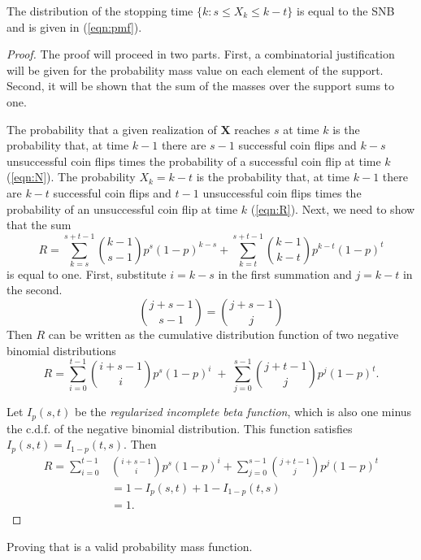 \documentclass[12pt]{article}         %
\begin{document}
\begin{prop}
The distribution of the stopping time $\{k: s \leq X_k \leq k-t \}$ is equal to the SNB and is given in (\ref{eqn:pmf}). 
\end{prop}
\begin{proof}
The proof will proceed in two parts. First, a combinatorial justification will be given for the probability mass value on each element of the support. Second, it will be shown that the sum of the masses over the support sums to one.

The probability that a given realization of $\mathbf{X}$ reaches $s$ at 
time $k$ is  the probability that, at time $k-1$ there are $s-1$ successful 
coin flips and $k-s$ unsuccessful coin flips times the probability of a 
successful coin flip at time $k$ (\ref{eqn:N}). The probability $X_k = k-t$ 
is the probability that, at time $k-1$ there are $k-t$ successful coin flips 
and $t-1$ unsuccessful coin flips times the probability of an unsuccessful 
coin flip at time $k$ (\ref{eqn:R}).  Next, we need to show that the sum
\begin{equation} \label{eqn:sum_proof}
R = \sum_{k=s}^{s+t-1} {k-1 \choose s-1} p^s (1-p)^{k-s} + \sum_{k=t}^{s+t-1} {k-1 \choose k-t} p^{k-t} (1-p)^t
\end{equation}
is equal to one.
First, substitute $i=k-s$ in the first summation and
$j=k-t$ in the second. 
\begin{equation*}
{j+s-1 \choose s-1} = {j+s-1 \choose j}
\end{equation*}
Then %
$R$ can be written
as the cumulative distribution function of two 
negative binomial distributions
\begin{equation} \label{eqn:transformed_sum}
R = \sum_{i=0}^{t-1} {i+s-1 \choose i} p^s (1-p)^i \; + \;
\sum_{j=0}^{s-1} {j+t-1 \choose j} p^j (1-p)^t.
\end{equation}

Let $I_p(s, t)$ be the {\em regularized incomplete beta function}, which is 
also one minus the c.d.f. of the negative binomial distribution. This
function satisfies $I_p(s, t) = I_{1-p}(t, s)$.  Then 
\begin{align*}
R = \sum_{i=0}^{t-1} &{i+s-1 \choose i} p^s (1-p)^i +
\sum_{j=0}^{s-1}  {j+t-1 \choose j} p^j  (1-p)^t \\
   &= 1-I_p(s, t) + 1 - I_{1-p}(t, s) \\
   &= 1. 
\end{align*}
\end{proof}
Proving that \label{eqn:pmf} is a valid probability mass function.
\end{document}
